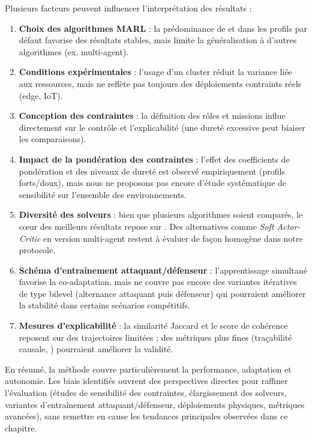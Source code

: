 Plusieurs facteurs peuvent influencer l'interprétation des résultats :
\begin{enumerate}[label={\alph*)}]
  \item \textbf{Choix des algorithmes MARL} : la prédominance de  et  dans les profils par défaut favorise des résultats stables, mais limite la généralisation à d'autres algorithmes (ex.  multi-agent).
  \item \textbf{Conditions expérimentales} : l'usage d'un cluster  réduit la variance liée aux ressources, mais ne reflète pas toujours des déploiements contraints réels (edge, IoT).
  \item \textbf{Conception des contraintes} : la définition des rôles et missions influe directement sur le contrôle et l'explicabilité (une dureté excessive peut biaiser les comparaisons).
  \item \textbf{Impact de la pondération des contraintes} : l'effet des coefficients de pondération et des niveaux de dureté est observé empiriquement (profils forts/doux), mais nous ne proposons pas encore d'étude systématique de sensibilité sur l'ensemble des environnements.
  \item \textbf{Diversité des solveurs} : bien que plusieurs algorithmes soient comparés, le cœur des meilleurs résultats repose sur . Des alternatives comme \textit{Soft Actor-Critic} en version multi-agent restent à évaluer de façon homogène dans notre protocole.
  \item \textbf{Schéma d'entraînement attaquant/défenseur} : l'apprentissage simultané favorise la co-adaptation, mais ne couvre pas encore des variantes itératives de type bilevel (alternance attaquant puis défenseur) qui pourraient améliorer la stabilité dans certains scénarios compétitifs.
  \item \textbf{Mesures d'explicabilité} : la similarité Jaccard et le score de cohérence reposent sur des trajectoires limitées ; des métriques plus fines (traçabilité causale, ) pourraient améliorer la validité.
\end{enumerate}

\medskip
En résumé, la méthode  couvre particulièrement la performance, adaptation et autonomie. Les biais identifiés ouvrent des perspectives directes pour raffiner l'évaluation (études de sensibilité des contraintes, élargissement des solveurs, variantes d'entraînement attaquant/défenseur, déploiements physiques, métriques avancées), sans remettre en cause les tendances principales observées dans ce chapitre.

